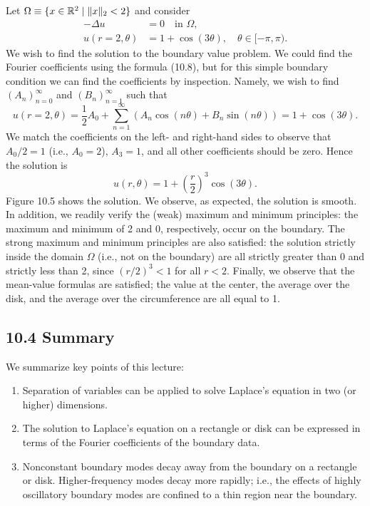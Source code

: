 \begin{example}
    Let $\Omega \equiv \{x \in \mathbb{R}^2 \mid \|x\|_2 < 2\}$ and consider
    \begin{align*}
        -\Delta u &= 0 \quad \text{in } \Omega, \\
        u(r = 2, \theta) &= 1 + \cos(3\theta), \quad \theta \in [-\pi, \pi).
    \end{align*}
    We wish to find the solution to the boundary value problem. We could find the Fourier coefficients using the formula (10.8), but for this simple boundary condition we can find the coefficients by inspection. Namely, we wish to find $(A_n)_{n=0}^{\infty}$ and $(B_n)_{n=1}^{\infty}$ such that
    \[u(r = 2, \theta) = \frac{1}{2}A_0 + \sum_{n=1}^{\infty} (A_n\cos(n\theta) + B_n\sin(n\theta)) = 1 + \cos(3\theta).\]
    We match the coefficients on the left- and right-hand sides to observe that $A_0/2 = 1$ (i.e., $A_0 = 2$), $A_3 = 1$, and all other coefficients should be zero. Hence the solution is
    \[u(r, \theta) = 1 + \left(\frac{r}{2}\right)^3 \cos(3\theta).\]
    Figure 10.5 shows the solution. We observe, as expected, the solution is smooth. In addition, we readily verify the (weak) maximum and minimum principles: the maximum and minimum of 2 and 0, respectively, occur on the boundary. The strong maximum and minimum principles are also satisfied: the solution strictly inside the domain $\Omega$ (i.e., not on the boundary) are all strictly greater than 0 and strictly less than 2, since $(r/2)^3 < 1$ for all $r < 2$. Finally, we observe that the mean-value formulas are satisfied; the value at the center, the average over the disk, and the average over the circumference are all equal to 1.

\end{example}

\subsection{10.4 Summary}
We summarize key points of this lecture:
\begin{enumerate}
    \item Separation of variables can be applied to solve Laplace's equation in two (or higher) dimensions.
    \item The solution to Laplace's equation on a rectangle or disk can be expressed in terms of the Fourier coefficients of the boundary data.
    \item Nonconstant boundary modes decay away from the boundary on a rectangle or disk. Higher-frequency modes decay more rapidly; i.e., the effects of highly oscillatory boundary modes are confined to a thin region near the boundary.
\end{enumerate}
